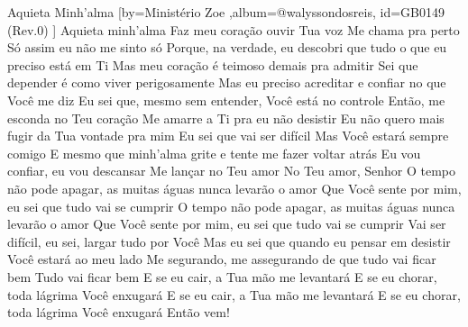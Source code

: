 \beginsong
{Aquieta Minh'alma %
}[by={Ministério Zoe %
},album={@walyssondosreis},
id={GB0149 %
(Rev.0) %
}]
\beginchorus
Aquieta minh'alma
Faz meu coração ouvir Tua voz
Me chama pra perto
Só assim eu não me sinto só
\endchorus
\beginverse*
Porque, na verdade, eu descobri que tudo o que eu preciso está em Ti
Mas meu coração é teimoso demais pra admitir
Sei que depender é como viver perigosamente
Mas eu preciso acreditar e confiar no que Você me diz
\endverse
\beginverse*
Eu sei que, mesmo sem entender, Você está no controle
Então, me esconda no Teu coração
Me amarre a Ti pra eu não desistir
\endverse
\beginverse*
Eu não quero mais fugir da Tua vontade pra mim
Eu sei que vai ser difícil
Mas Você estará sempre comigo
\endverse
\beginverse*
E mesmo que minh'alma grite e tente me fazer voltar atrás
Eu vou confiar, eu vou descansar
Me lançar no Teu amor
No Teu amor, Senhor
\endverse
\beginverse*
O tempo não pode apagar, as muitas águas nunca levarão o amor
Que Você sente por mim, eu sei que tudo vai se cumprir
O tempo não pode apagar, as muitas águas nunca levarão o amor
Que Você sente por mim, eu sei que tudo vai se cumprir
\endverse
\beginverse*
Vai ser difícil, eu sei, largar tudo por Você
Mas eu sei que quando eu pensar em desistir
Você estará ao meu lado
Me segurando, me assegurando de que tudo vai ficar bem
Tudo vai ficar bem
\endverse
\beginverse*
E se eu cair, a Tua mão me levantará
E se eu chorar, toda lágrima Você enxugará
E se eu cair, a Tua mão me levantará
E se eu chorar, toda lágrima Você enxugará
Então vem!
\endverse

